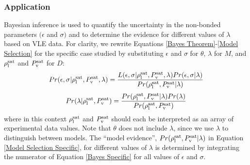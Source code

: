\documentclass[preprint,letterpaper,floatfix,citeautoscript,aip,jcp]{revtex4-1}
\begin{document}
\subsubsection{Application}

Bayesian inference is used to quantify the uncertainty in the non-bonded parameters $(\epsilon$ and $\sigma)$ and to determine the evidence for different values of $\lambda$ based on VLE data. 
For clarity, we rewrite Equations \ref{Bayes Theorem}-\ref{Model Selection} for the specific case studied by substituting $\epsilon$ and $\sigma$ for $\theta$, $\lambda$ for $M$, and $\rho_{\rm l}^{\rm sat}$ and $P_{\rm v}^{\rm sat}$ for $D$:
\begin{equation} \label{Bayes Specific}
Pr(\epsilon,\sigma|\rho_{\rm l}^{\rm sat},P_{\rm v}^{\rm sat},\lambda) = \frac{L(\epsilon,\sigma|\rho_{\rm l}^{\rm sat},P_{\rm v}^{\rm sat},\lambda)Pr(\epsilon,\sigma|\lambda)}{Pr(\rho_{\rm l}^{\rm sat},P_{\rm v}^{\rm sat}|\lambda)}
\end{equation}
\begin{equation} \label{Model Selection Specific}
Pr(\lambda|\rho_{\rm l}^{\rm sat},P_{\rm v}^{\rm sat}) = \frac{Pr(\rho_{\rm l}^{\rm sat},P_{\rm v}^{\rm sat}|\lambda)Pr(\lambda)}{Pr(\rho_{\rm l}^{\rm sat},P_{\rm v}^{\rm sat})}
\end{equation}
where in this context $\rho_{\rm l}^{\rm sat}$ and $P_{\rm v}^{\rm sat}$ should each be interpreted as an array of experimental data values. Note that $\theta$ does not include $\lambda$, since we use $\lambda$ to distinguish between models. The ``model evidence'', $Pr(\rho_{\rm l}^{\rm sat},P_{\rm v}^{\rm sat}|\lambda)$ in Equation \ref{Model Selection Specific}, for different values of $\lambda$ is determined by integrating the numerator of Equation \ref{Bayes Specific} for all values of $\epsilon$ and $\sigma$. 

\end{document}
